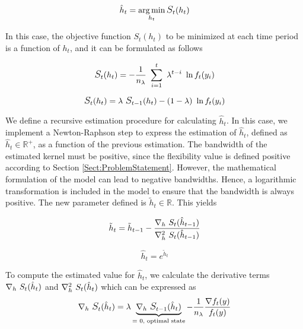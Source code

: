 \begin{equation}
    \hat{h}_{t} = \argmin_{h_{t}} \mathlarger{S}_t (h_{t}) 
\end{equation} 

In this case, the objective function $S_t(h_{t})$ to be minimized at each time period is a function of $h_{t}$, and it can be formulated as follows 

\begin{equation}
    \mathlarger{S}_t (h_{t}) = -\frac{1}{n_{\lambda}}\ \sum_{i=1}^{t} \ \lambda^{t-i} \ \ln f_t(y_i)
\end{equation}

\begin{equation}
    \mathlarger{S}_t (h_{t}) = \lambda \ \mathlarger{S}_{t-1}(h_{t}) - (1-\lambda) \  \ln f_t(y_i)
\end{equation}

We define a recursive estimation procedure for calculating $\hat{h}_{t}$. In this case, we implement a Newton-Raphson step to express the estimation of $\hat{h}_{t}$, defined as $\hat{h}_t \in \mathbb{R}^+$, as a function of the previous estimation. 
The bandwidth of the estimated kernel must be positive, since the flexibility value is defined positive according to Section \ref{Sect:ProblemStatement}. However, the mathematical formulation of the model can lead to negative bandwidths. Hence, a logarithmic transformation is included in the model to ensure that the bandwidth is always positive. The new parameter defined is $\tilde{h}_t \in \mathbb{R}$. This yields

\begin{equation}
    \tilde{h}_t = \tilde{h}_{t-1} - \frac{ \nabla_h \ \mathlarger{S}_t (\hat{h}_{t-1}) }{\nabla^2_h \ \mathlarger{S}_t (\hat{h}_{t-1})}
\end{equation}

\begin{equation}
    \hat{h}_t = e^{\tilde{h}_t}
\end{equation}

To compute the estimated value for $\hat{h}_{t}$, we calculate the derivative terms $ \nabla_h \ \mathlarger{S}_t (\hat{h}_{t})$ and $\nabla^2_h \ \mathlarger{S}_t (\hat{h}_{t})$ which can be expressed as
\begin{equation}
     \nabla_h \ \mathlarger{S}_t (\hat{h}_{t}) =  \lambda\underbrace{\nabla_h \ \mathlarger{S}_{t-1} (\hat{h}_{t})}_{\text{= 0, optimal state}} - \frac{1}{n_{\lambda}} \frac{\nabla f_t (y)}{f_t (y)}
\end{equation}

